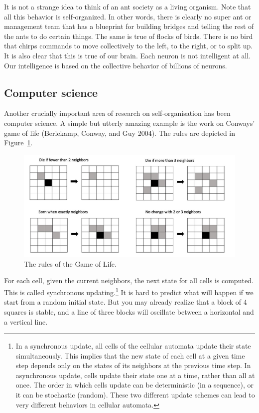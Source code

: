 \documentclass[
  a4paper,
  DIV=11,
  numbers=noendperiod,
  oneside]{scrreprt}
\begin{document}
It is not a strange idea to think of an ant society as a living
organism. Note that all this behavior is self-organized. In other words,
there is clearly no super ant or management team that has a blueprint
for building bridges and telling the rest of the ants to do certain
things. The same is true of flocks of birds. There is no bird that
chirps commands to move collectively to the left, to the right, or to
split up. It is also clear that this is true of our brain. Each neuron
is not intelligent at all. Our intelligence is based on the collective
behavior of billions of neurons.

\hypertarget{sec-Computer-science}{%
\subsection{Computer science}\label{sec-Computer-science}}

Another crucially important area of research on self-organisation has
been computer science. A simple but utterly amazing example is the work
on Conways' game of life (Berlekamp, Conway, and Guy 2004). The rules
are depicted in Figure~\ref{fig-ch5n-img3-old-41}.

\begin{figure}

{\centering \includegraphics{media/ch5n/image3.jpg}

}

\caption{\label{fig-ch5n-img3-old-41}The rules of the Game of Life.}

\end{figure}

For each cell, given the current neighbors, the next state for all cells
is computed. This is called synchronous updating.\footnote{In a
  synchronous update, all cells of the cellular automata update their
  state simultaneously. This implies that the new state of each cell at
  a given time step depends only on the states of its neighbors at the
  previous time step. In asynchronous update, cells update their state
  one at a time, rather than all at once. The order in which cells
  update can be deterministic (in a sequence), or it can be stochastic
  (random). These two different update schemes can lead to very
  different behaviors in cellular automata.} It is hard to predict what
will happen if we start from a random initial state. But you may already
realize that a block of 4 squares is stable, and a line of three blocks
will oscillate between a horizontal and a vertical line.
\end{document}
